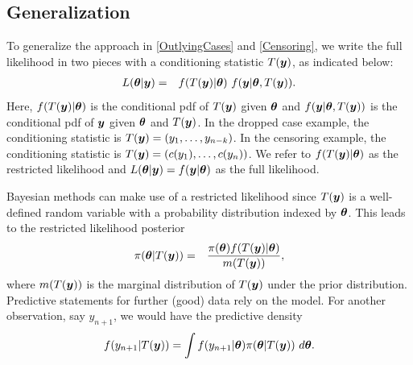 \documentclass[ba]{imsart}
\def\bth{\mbox{\boldmath $\theta$}}
\newcommand{\by}{\mbox{\boldmath $y$}}
\begin{document}
\subsection{Generalization}

To generalize the approach in \eqref{OutlyingCases} and
\eqref{Censoring}, %
we write the full likelihood in two pieces with a conditioning statistic $T(\by)$, as indicated below:
\begin{eqnarray}
\label{FullLikelihood}
L(\bth | \by)  
& = & f(T(\by) | \bth) \,\, f(\by |\bth, T(\by)) .  
\end{eqnarray}
Here,  $f(T(\by) | \bth)$ is the conditional pdf of $T(\by)$ given $\bth$ and $f(\by |\bth, T(\by))$ is the conditional pdf of $\by$ given $\bth$ and $T(\by)$.  In the dropped case example, the conditioning statistic is $T(\by) = (y_1, \ldots, y_{n-k})$.  In 
the censoring example, the conditioning statistic is $T(\by) = (c(y_1),\ldots,c(y_n))$.  We refer to 
$f(T(\by) | \bth)$ as the restricted likelihood and $L(\bth | \by)=f(\by|\bth)$ as the full likelihood.  

Bayesian methods can make use of a restricted likelihood %
since $T(\by)$ is a well-defined random variable with a probability distribution indexed by $\bth$.  
This leads to the restricted likelihood posterior 
\begin{eqnarray}
\label{RestrictedPosterior}
\pi(\bth | T(\by)) & = & \frac{\pi(\bth) f(T(\by) | \bth)}{m(T(\by))} ,
\end{eqnarray}
where $m(T(\by))$ is the marginal distribution of $T(\by)$ under the prior distribution.  
Predictive statements for further (good) data rely on the model.  For another observation,
say $y_{n+1}$, we would have the predictive density 
\begin{eqnarray}
\label{RestrictedpredDist}
f(y_{n+1} | T(\by)) = \int f(y_{n+1} | \bth) \pi(\bth | T(\by))\ d\bth .  
\end{eqnarray}
\end{document}
